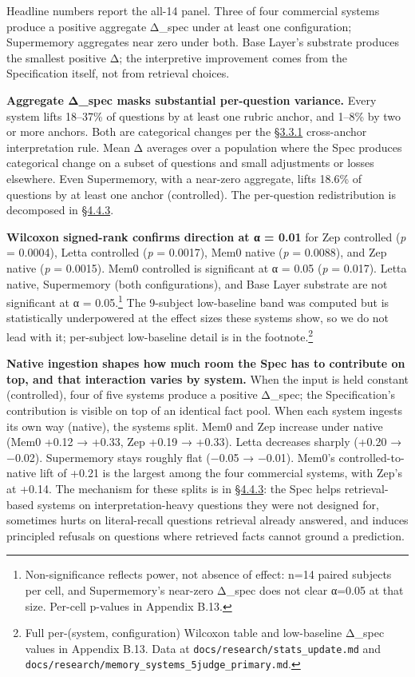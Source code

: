 Headline numbers report the all-14 panel. Three of four commercial
systems produce a positive aggregate Δ\_spec under at least one
configuration; Supermemory aggregates near zero under both. Base Layer's
substrate produces the smallest positive Δ; the interpretive improvement
comes from the Specification itself, not from retrieval choices.

\textbf{Aggregate Δ\_spec masks substantial per-question variance.}
Every system lifts 18--37\% of questions by at least one rubric anchor,
and 1--8\% by two or more anchors. Both are categorical changes per the
\hyperref[score-interpretation]{§3.3.1} cross-anchor interpretation rule. Mean Δ averages over a
population where the Spec produces categorical change on a subset of
questions and small adjustments or losses elsewhere. Even Supermemory,
with a near-zero aggregate, lifts 18.6\% of questions by at least one
anchor (controlled). The per-question redistribution is decomposed in
\hyperref[where-the-spec-helps-where-it-hurts-and-which-question-types-route-to-each]{§4.4.3}.

\textbf{Wilcoxon signed-rank confirms direction at α = 0.01} for Zep
controlled (\emph{p} = 0.0004), Letta controlled (\emph{p} = 0.0017),
Mem0 native (\emph{p} = 0.0088), and Zep native (\emph{p} = 0.0015).
Mem0 controlled is significant at α = 0.05 (\emph{p} = 0.017). Letta
native, Supermemory (both configurations), and Base Layer substrate are
not significant at α = 0.05.\footnote{Non-significance reflects
  power, not absence of effect: n=14 paired subjects per cell, and
  Supermemory's near-zero Δ\_spec does not clear α=0.05 at that size.
  Per-cell p-values in Appendix B.13.} The 9-subject low-baseline band was computed but is
statistically underpowered at the effect sizes these systems show, so we
do not lead with it; per-subject low-baseline detail is in the
footnote.\footnote{Full per-(system, configuration) Wilcoxon table and
  low-baseline Δ\_spec values in Appendix B.13. Data at
  \texttt{docs/research/stats\_update.md} and
  \texttt{docs/research/memory\_systems\_5judge\_primary.md}.}

\textbf{Native ingestion shapes how much room the Spec has to contribute
on top, and that interaction varies by system.} When the input is held
constant (controlled), four of five systems produce a positive Δ\_spec;
the Specification's contribution is visible on top of an identical fact
pool. When each system ingests its own way (native), the systems split.
Mem0 and Zep increase under native (Mem0 +0.12 → +0.33, Zep +0.19 →
+0.33). Letta decreases sharply (+0.20 → −0.02). Supermemory stays
roughly flat (−0.05 → −0.01). Mem0's controlled-to-native lift of +0.21
is the largest among the four commercial systems, with Zep's at +0.14.
The mechanism for these splits is in \hyperref[where-the-spec-helps-where-it-hurts-and-which-question-types-route-to-each]{§4.4.3}: the Spec helps
retrieval-based systems on interpretation-heavy questions they were not
designed for, sometimes hurts on literal-recall questions retrieval
already answered, and induces principled refusals on questions where
retrieved facts cannot ground a prediction.

